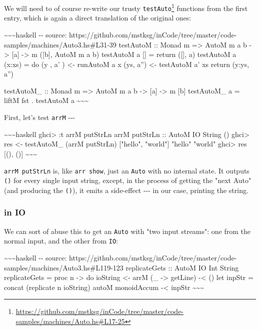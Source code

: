 \documentclass[]{article}
\renewcommand{\href}[2]{#2\footnote{\url{#1}}}
\begin{document}
We will need to of course re-write our trusty
\href{https://github.com/mstksg/inCode/tree/master/code-samples/machines/Auto.hs\#L17-25}{\texttt{testAuto}}
functions from the first entry, which is again a direct translation of the
original ones:

\textasciitilde{}\textasciitilde{}\textasciitilde{}haskell -\/- source:
https://github.com/mstksg/inCode/tree/master/code-samples/machines/Auto3.hs\#L31-39
testAutoM :: Monad m =\textgreater{} AutoM m a b -\textgreater{} {[}a{]}
-\textgreater{} m ({[}b{]}, AutoM m a b) testAutoM a {[}{]} = return ({[}{]}, a)
testAutoM a (x:xs) = do (y , a' ) \textless{}- runAutoM a x (ys, a'')
\textless{}- testAutoM a' xs return (y:ys, a'')

testAutoM\_ :: Monad m =\textgreater{} AutoM m a b -\textgreater{} {[}a{]}
-\textgreater{} m {[}b{]} testAutoM\_ a = liftM fst . testAutoM a
\textasciitilde{}\textasciitilde{}\textasciitilde{}

First, let's test \texttt{arrM} -\/-\/-

\textasciitilde{}\textasciitilde{}\textasciitilde{}haskell ghci\textgreater{} :t
arrM putStrLn arrM putStrLn :: AutoM IO String () ghci\textgreater{} res
\textless{}- testAutoM\_ (arrM putStrLn) {[}"hello", "world"{]} "hello" "world"
ghci\textgreater{} res {[}(), (){]}
\textasciitilde{}\textasciitilde{}\textasciitilde{}

\texttt{arrM\ putStrLn} is, like \texttt{arr\ show}, just an \texttt{Auto} with
no internal state. It outputs \texttt{()} for every single input string, except,
in the process of getting the "next Auto" (and producing the \texttt{()}), it
emits a side-effect -\/-\/- in our case, printing the string.

\subsubsection{in IO}

We can sort of abuse this to get an \texttt{Auto} with "two input streams": one
from the normal input, and the other from \texttt{IO}:

\textasciitilde{}\textasciitilde{}\textasciitilde{}haskell -\/- source:
https://github.com/mstksg/inCode/tree/master/code-samples/machines/Auto3.hs\#L119-123
replicateGets :: AutoM IO Int String replicateGets = proc n -\textgreater{} do
ioString \textless{}- arrM (\_ -\textgreater{} getLine) -\textless{} () let
inpStr = concat (replicate n ioString) autoM monoidAccum -\textless{} inpStr
\textasciitilde{}\textasciitilde{}\textasciitilde{}
\end{document}

